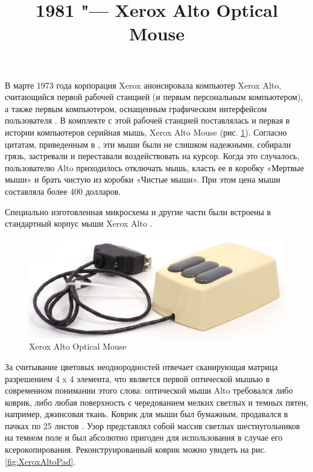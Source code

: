 \documentclass[11pt, a4paper]{article}
\begin{document}
\title{1981 "--- Xerox Alto Optical Mouse}
\date{}
\maketitle
{}

В марте 1973 года корпорация Xerox анонсировала компьютер Xerox Alto, считающийся первой рабочей станцией (и первым персональным компьютером), а также первым компьютером, оснащенным графическим интерфейсом пользователя \cite{wiki}. В комплекте с этой рабочей станцией поставлялась и первая в истории компьютеров серийная мышь, Xerox Alto Mouse (рис. \ref{fig:XeroxAltoPic}). Согласно цитатам, приведенным в \cite{mouses}, эти мыши были не слишком надежными, собирали грязь, застревали и переставали воздействовать на курсор. Когда это случалось, пользователю Alto приходилось отключать мышь, класть ее в коробку «Мертвые мыши» и брать чистую из коробки «Чистые мыши». При этом цена мыши составляла более 400 долларов.


Специально изготовленная микросхема и другие части были встроены в стандартный корпус мыши Xerox Alto \cite{vlsi82}.

\begin{figure}[h]
    \centering
    \includegraphics[scale=0.7]{1981_xerox_alto_mouse/pic_30.jpg}
    \caption{Xerox Alto Optical Mouse}
    \label{fig:XeroxAltoPic}
\end{figure}
За считывание цветовых неоднородностей отвечает сканирующая матрица разрешением 4 x 4 элемента, что является первой оптической мышью в современном понимании этого слова: оптической мыши Alto требовался либо коврик, либо любая поверхность с чередованием мелких светлых и темных пятен, например, джинсовая ткань. 
Коврик для мыши был бумажным, продавался в пачках по 25 листов \cite{pad}. Узор представлял собой массив светлых шестиугольников на темном поле и был абсолютно пригоден для использования в случае его ксерокопирования. Реконструированный коврик можно увидеть на рис. \ref{fig:XeroxAltoPad}.
\end{document}
